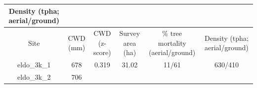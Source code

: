 \documentclass[]{article}
\begin{document}
\begin{longtable}[]{@{}cccccc@{}}
\begin{minipage}[b]{0.22\columnwidth}
Density (tpha; aerial/ground)\strut
\end{minipage}\tabularnewline
\midrule
\endfirsthead
\toprule
\begin{minipage}[b]{0.11\columnwidth}\centering\strut
Site\strut
\end{minipage} & \begin{minipage}[b]{0.07\columnwidth}\centering\strut
CWD (mm)\strut
\end{minipage} & \begin{minipage}[b]{0.11\columnwidth}\centering\strut
CWD (z-score)\strut
\end{minipage} & \begin{minipage}[b]{0.13\columnwidth}\centering\strut
Survey area (ha)\strut
\end{minipage} & \begin{minipage}[b]{0.18\columnwidth}\centering\strut
\% tree mortality (aerial/ground)\strut
\end{minipage} & \begin{minipage}[b]{0.22\columnwidth}\centering\strut
Density (tpha; aerial/ground)\strut
\end{minipage}\tabularnewline
\midrule
\endhead
\begin{minipage}[t]{0.11\columnwidth}\centering\strut
eldo\_3k\_1\strut
\end{minipage} & \begin{minipage}[t]{0.07\columnwidth}\centering\strut
678\strut
\end{minipage} & \begin{minipage}[t]{0.11\columnwidth}\centering\strut
0.319\strut
\end{minipage} & \begin{minipage}[t]{0.13\columnwidth}\centering\strut
31.02\strut
\end{minipage} & \begin{minipage}[t]{0.18\columnwidth}\centering\strut
11/61\strut
\end{minipage} & \begin{minipage}[t]{0.22\columnwidth}\centering\strut
630/410\strut
\end{minipage}\tabularnewline
\begin{minipage}[t]{0.11\columnwidth}\centering\strut
eldo\_3k\_2\strut
\end{minipage} & \begin{minipage}[t]{0.07\columnwidth}\centering\strut
706\strut
\end{minipage} & \begin{minipage}[t]{0.11\columnwidth}\centering\strut

\end{minipage}
\end{longtable}
\end{document}
